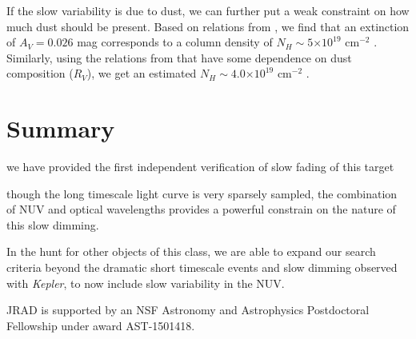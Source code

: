 \documentclass[twocolumn]{aastex6}
\providecommand{\e}[1]{\ensuremath{\times 10^{#1}}}
\newcommand{\Kepler}{\textsl{Kepler}\xspace}
\begin{document}
If the slow variability is due to dust, we can further put a weak constraint on how much dust should be present. Based on relations from \citep{guver2009}, we find that an extinction of $A_V = 0.026$ mag corresponds to 
a column density of $N_H\sim5\e{19}$ cm$^{-2}$ . Similarly, using the relations from \citet{rachford2002} that have some dependence on dust composition ($R_V$), we get an estimated $N_H\sim4.0\e{19}$ cm$^{-2}$ .




\section{Summary}
\label{sec:summary}

we have provided the first independent verification of slow fading of this target

though the long timescale light curve is very sparsely sampled, the combination of NUV and optical wavelengths provides a powerful constrain on the nature of this slow dimming. 

In the hunt for other objects of this class, we are able to expand our search criteria beyond the dramatic short timescale events and slow dimming observed with \Kepler, to now include slow variability in the NUV. 



\acknowledgments
JRAD is supported by an NSF Astronomy and Astrophysics Postdoctoral Fellowship under award AST-1501418. 



\end{document}
